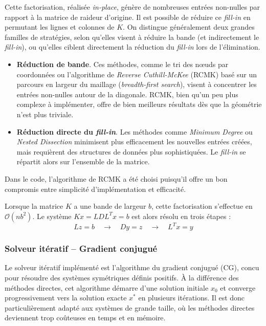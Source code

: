 \documentclass[12pt]{article}
\begin{document}
Cette factorisation, réalisée \textit{in-place}, 
génère de nombreuses entrées non-nulles par rapport à la
matrice de raideur d'origine. Il est possible de réduire ce \textit{fill-in} 
en permutant les lignes et colonnes de $K$. 
On distingue généralement deux grandes familles de stratégies, selon qu’elles 
visent à réduire la bande (et indirectement le \textit{fill-in}), ou qu’elles 
ciblent directement la réduction du \textit{fill-in} lors de l’élimination.

\begin{itemize}
    \item \textbf{Réduction de bande}. Ces méthodes, comme le tri des n\oe uds 
    par coordonnées ou l'algorithme de \textit{Reverse Cuthill-McKee} (RCMK) 
    basé sur un parcours en largeur du maillage (\textit{breadth-first search}), 
    visent à concentrer les entrées non-nulles autour de la diagonale. 
    RCMK, bien qu'un peu plus complexe à implémenter, offre de bien meilleurs 
    résultats dès que la géométrie n'est plus triviale.
    \item \textbf{Réduction directe du \textit{fill-in}}. Les méthodes comme 
    \textit{Minimum Degree} ou \textit{Nested Dissection} minimisent plus 
    efficacement les nouvelles entrées créées, mais requièrent des structures 
    de données plus sophistiquées. Le \textit{fill-in} se répartit alors sur 
    l’ensemble de la matrice.
\end{itemize}

Dans le code, l'algorithme de RCMK a été choisi puisqu'il offre un bon compromis
entre simplicité d'implémentation et efficacité.

Lorsque la matrice $K$ a une bande de largeur $b$, cette factorisation 
s'effectue en $\mathcal{O}(nb^2)$. Le système $Kx = LDL^T x =b$ est alors 
résolu en trois étapes :
\begin{equation}
    L z = b \quad\longrightarrow\quad 
    D y = z \quad\longrightarrow\quad 
    L^T x = y
\end{equation}

\subsubsection{Solveur itératif -- Gradient conjugué}

Le solveur itératif implémenté est l'algorithme du gradient conjugué (CG),
concu pour résoudre des systèmes symétriques définis positifs. À la différence 
des méthodes directes, cet algorithme démarre d'une solution initiale $x_0$ et
converge progressivement vers la solution exacte $x^*$ en plusieurs itérations.
Il est donc particulièrement adapté aux systèmes de grande taille, où les 
méthodes directes deviennent trop coûteuses en temps et en mémoire.
\end{document}
